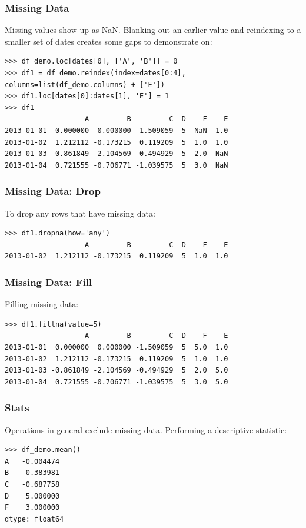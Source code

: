 \begin{frame}[fragile]\frametitle{Missing Data}
Missing values show up as NaN. Blanking out an earlier value and reindexing to a smaller set
of dates creates some gaps to demonstrate on:
\begin{lstlisting}[basicstyle=\tiny\ttfamily]
>>> df_demo.loc[dates[0], ['A', 'B']] = 0
>>> df1 = df_demo.reindex(index=dates[0:4], columns=list(df_demo.columns) + ['E'])
>>> df1.loc[dates[0]:dates[1], 'E'] = 1
>>> df1
                   A         B         C  D    F    E
2013-01-01  0.000000  0.000000 -1.509059  5  NaN  1.0
2013-01-02  1.212112 -0.173215  0.119209  5  1.0  1.0
2013-01-03 -0.861849 -2.104569 -0.494929  5  2.0  NaN
2013-01-04  0.721555 -0.706771 -1.039575  5  3.0  NaN
\end{lstlisting}
\end{frame}

\begin{frame}[fragile]\frametitle{Missing Data: Drop}
To drop any rows that have missing data:
\begin{lstlisting}[basicstyle=\tiny\ttfamily]
>>> df1.dropna(how='any')
                   A         B         C  D    F    E
2013-01-02  1.212112 -0.173215  0.119209  5  1.0  1.0
\end{lstlisting}
\end{frame}

\begin{frame}[fragile]\frametitle{Missing Data: Fill}
Filling missing data:
\begin{lstlisting}[basicstyle=\tiny\ttfamily]
>>> df1.fillna(value=5)
                   A         B         C  D    F    E
2013-01-01  0.000000  0.000000 -1.509059  5  5.0  1.0
2013-01-02  1.212112 -0.173215  0.119209  5  1.0  1.0
2013-01-03 -0.861849 -2.104569 -0.494929  5  2.0  5.0
2013-01-04  0.721555 -0.706771 -1.039575  5  3.0  5.0
\end{lstlisting}
\end{frame}

\begin{frame}[fragile]\frametitle{Stats}
Operations in general exclude missing data.
Performing a descriptive statistic:
\begin{lstlisting}
>>> df_demo.mean()
A   -0.004474
B   -0.383981
C   -0.687758
D    5.000000
F    3.000000
dtype: float64
\end{lstlisting}
\end{frame}


